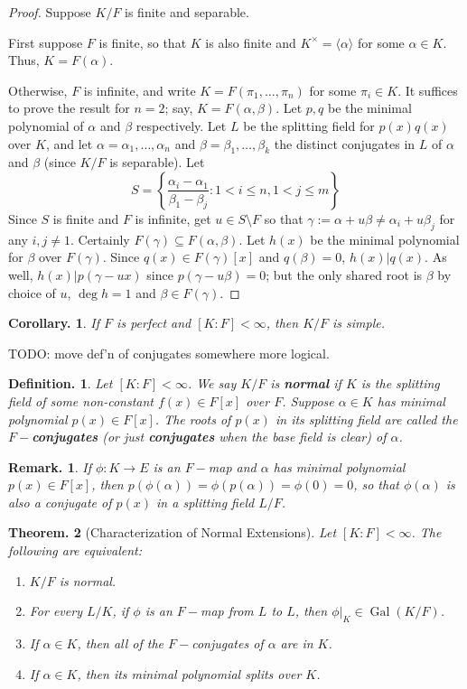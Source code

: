 \documentclass[11pt, a4paper]{memoir}
\newcommand{\mbf}[1]{{\boldmath\bfseries #1}}
\theoremstyle{change}
\newtheorem{theorem}{Theorem.}[section]
\newtheorem{corollary}[theorem]{Corollary.}
\theoremstyle{plain}
\theoremstyle{nonumberplain}
\newtheorem{definition}{Definition.}
\newtheorem{remark}{Remark.}
\newtheorem{proof}{Proof}
\DeclareMathOperator{\Gal}{Gal}
\numberwithin{equation}{section}
\begin{document}
\begin{proof}
    Suppose $K/F$ is finite and separable.

    First suppose $F$ is finite, so that $K$ is also finite and $K^\times=\langle\alpha\rangle$ for some $\alpha\in K$.
    Thus, $K=F(\alpha)$.

    Otherwise, $F$ is infinite, and write $K=F(\pi_1,\ldots,\pi_n)$ for some $\pi_i\in K$.
    It suffices to prove the result for $n=2$; say, $K=F(\alpha,\beta)$.
    Let $p,q$ be the minimal polynomial of $\alpha$ and $\beta$ respectively.
    Let $L$ be the splitting field for $p(x)q(x)$ over $K$, and let $\alpha=\alpha_1,\ldots,\alpha_n$ and $\beta=\beta_1,\ldots,\beta_k$ the distinct conjugates in $L$ of $\alpha$ and $\beta$ (since $K/F$ is separable).
    Let
    \begin{equation*}
        S=\left\{\frac{\alpha_i-\alpha_1}{\beta_1-\beta_j}:1<i\leq n,1<j\leq m\right\}
    \end{equation*}
    Since $S$ is finite and $F$ is infinite, get $u\in S\setminus F$ so that $\gamma:=\alpha+u\beta\neq\alpha_i+u\beta_j$ for any $i,j\neq 1$.
    Certainly $F(\gamma)\subseteq F(\alpha,\beta)$.
    Let $h(x)$ be the minimal polynomial for $\beta$ over $F(\gamma)$.
    Since $q(x)\in F(\gamma)[x]$ and $q(\beta)=0$, $h(x)|q(x)$.
    As well, $h(x)|p(\gamma-ux)$ since $p(\gamma-u\beta)=0$;  but the only shared root is $\beta$ by choice of $u$, $\deg h=1$ and $\beta\in F(\gamma)$.
\end{proof}
\begin{corollary}
    If $F$ is perfect and $[K:F]<\infty$, then $K/F$ is simple.
\end{corollary}
TODO: move def'n of conjugates somewhere more logical.
\begin{definition}
    Let $[K:F]<\infty$.
    We say $K/F$ is \mbf{normal} if $K$ is the splitting field of some non-constant $f(x)\in F[x]$ over $F$.
    Suppose $\alpha\in K$ has minimal polynomial $p(x)\in F[x]$.
    The roots of $p(x)$ in its splitting field are called the \mbf{$F-$conjugates} (or just \mbf{conjugates} when the base field is clear) of $\alpha$.
\end{definition}
\begin{remark}
    If $\phi:K\to E$ is an $F-$map and $\alpha$ has minimal polynomial $p(x)\in F[x]$, then $p(\phi(\alpha))=\phi(p(\alpha))=\phi(0)=0$, so that $\phi(\alpha)$ is also a conjugate of $p(x)$ in a splitting field $L/F$.
\end{remark}
\begin{theorem}[Characterization of Normal Extensions]\label{thm:char-norm}
    Let $[K:F]<\infty$.
    The following are equivalent:
    \begin{enumerate}[nolistsep]
        \item $K/F$ is normal.
        \item For every $L/K$, if $\phi$ is an $F-$map from $L$ to $L$, then $\phi|_K\in\Gal(K/F)$.
        \item If $\alpha\in K$, then all of the $F-$conjugates of $\alpha$ are in $K$.
        \item If $\alpha\in K$, then its minimal polynomial splits over $K$.
    \end{enumerate}
\end{theorem}
\end{document}
